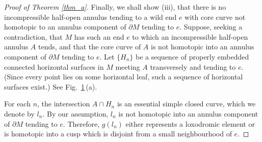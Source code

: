 \documentclass{amsart}
\theoremstyle{definition}
\numberwithin{figure}{section}
\numberwithin{equation}{section}
\def\part{\partial}
\begin{document}
\begin{proof}[Proof of Theorem \ref{thm_a}]
%

%
Finally, we shall show (iii), that there is no incompressible half-open annulus tending to a wild end $e$ with core curve not homotopic to an annulus component of $\partial M$ tending to $e$.
Suppose, seeking a contradiction, that $M$ has such an end $e$ to which an incompressible half-open annulus $A$ tends, and that the core curve of $A$ is not homotopic into an annulus component of $\partial M$ tending to $e$.
Let $\{H_n\}$ be a sequence of properly embedded connected horizontal surfaces in $M$ meeting $A$ transversely and tending to $e$.
(Since every point lies on some horizontal leaf, such a sequence of horizontal surfaces exist.)
See Fig.\ \ref{fig4_1}\,(a).
\begin{figure}[hbtp]
\centering
{}
\caption{}
\label{fig4_1}
\end{figure}
For each $n$, the intersection $A \cap H_n$ is an essential simple closed curve, which we denote by $l_n$.
By our assumption, $l_n$ is not homotopic into an annulus component of $\partial M$ tending to $e$.
Therefore, $g(l_n)$ either represents a loxodromic element or is homotopic into a cusp which is disjoint from a small neighbourhood of $e$.


\end{proof}
\end{document}
